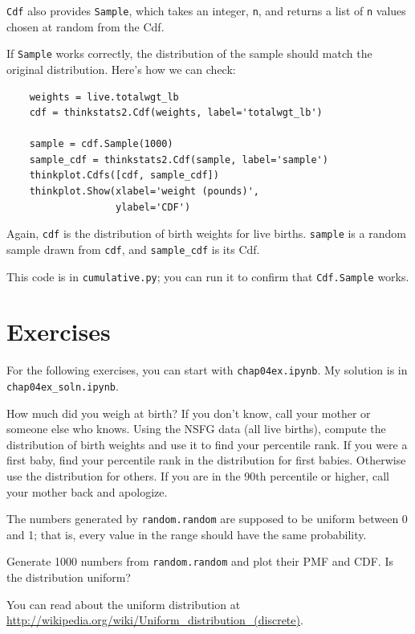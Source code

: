 \documentclass[12pt]{book}
\begin{document}
{\tt Cdf} also provides {\tt Sample}, which takes an integer,
{\tt n}, and returns a list of {\tt n} values chosen at random
from the Cdf.

If {\tt Sample} works correctly, the distribution of the sample
should match the original distribution.  Here's how we can check:

\begin{verbatim}
    weights = live.totalwgt_lb
    cdf = thinkstats2.Cdf(weights, label='totalwgt_lb')

    sample = cdf.Sample(1000)
    sample_cdf = thinkstats2.Cdf(sample, label='sample')
    thinkplot.Cdfs([cdf, sample_cdf])
    thinkplot.Show(xlabel='weight (pounds)',
                   ylabel='CDF')
\end{verbatim}

Again, {\tt cdf} is the distribution of birth weights for live
births.  {\tt sample} is a random sample drawn from {\tt cdf},
and \verb"sample_cdf" is its Cdf.

This code is in {\tt cumulative.py}; you can run it to confirm
that {\tt Cdf.Sample} works.



\section{Exercises}

For the following exercises, you can start with \verb"chap04ex.ipynb".
My solution is in \verb"chap04ex_soln.ipynb".

\begin{exercise}
How much did you weigh at birth?  If you don't know, call your mother
or someone else who knows.  Using the NSFG data (all live births),
compute the distribution of birth weights and use it to find your
percentile rank.  If you were a first baby, find your percentile rank
in the distribution for first babies.  Otherwise use the distribution
for others.  If you are in the 90th percentile or higher, call your
mother back and apologize.
\end{exercise}

\begin{exercise}
The numbers generated by {\tt random.random} are supposed to be
uniform between 0 and 1; that is, every value in the range
should have the same probability.

Generate 1000 numbers from {\tt random.random} and plot their
PMF and CDF.  Is the distribution uniform?

You can read about the uniform distribution at
\url{http://wikipedia.org/wiki/Uniform_distribution_(discrete)}.

\end{exercise}
\end{document}
